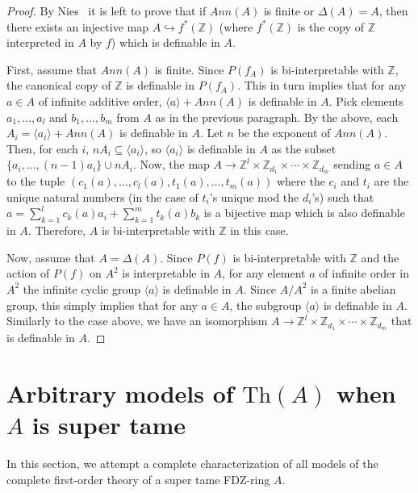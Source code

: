 \documentclass{article}
\theoremstyle{remark}
\newcommand{\Th}{\textrm{Th}}
\def\Z{{\mathbb{Z}}}
\begin{document}
\begin{proof}
By Nies~\cite{Nies2007} it is left to prove that if $Ann(A)$ is finite or $\Delta(A)=A$, then there exists an injective map $A\hookrightarrow f^*(\Z)$ (where $f^*(\Z)$ is the copy of $\Z$ interpreted in $A$ by $f$) which is definable in $A$.
 
    First, assume that $Ann(A)$ is finite. Since $P(f_A)$ is bi-interpretable with $\Z$, the canonical copy of $\Z$ is definable in $P(f_A)$. This in turn implies that for any $a\in A$ of infinite additive order, $\langle a\rangle+Ann(A)$ is definable in $A$. Pick elements $a_1,\ldots , a_l$ and $b_1, \ldots, b_m$ from $A$ as in the previous paragraph. By the above, each $A_i=\langle a_i\rangle+Ann(A)$ is definable in $A$. Let $n$ be the exponent of $Ann(A)$. Then, for each $i$, $nA_i \subseteq \langle a_i\rangle$, so $\langle a_i\rangle$ is definable in $A$ as the subset $\{a_i, \ldots, (n-1)a_i\}\cup nA_i$. Now, the map
$A\to \Z^l \times \Z_{d_1}\times \cdots \times \Z_{d_m}$ sending $a\in A$ to the tuple $(c_1(a), \ldots, c_l(a),t_1(a), \ldots, t_m(a))$ where the $c_i$ and $t_i$ are the unique natural numbers (in the case of $t_i$'s unique mod the $d_i$'s) such that $a=\sum_{k=1}^lc_k(a) a_i + \sum_{k=1}^mt_k(a) b_k$ is a bijective map which is also definable in $A$. Therefore, $A$ is bi-interpretable with $\Z$  in this case.

Now, assume that $A=\Delta(A)$. Since $P(f)$ is bi-interpretable with $\Z$ and the action of $P(f)$ on $A^2$ is interpretable in $A$, for any element $a$ of infinite order in $A^2$ the infinite cyclic group $\langle a\rangle$ is definable in $A$. Since $A/A^2$ is a finite abelian group, this simply implies that for any $a\in A$, the subgroup $\langle a\rangle$ is definable in $A$. Similarly to the case above, we have an isomorphism $A\to \Z^l \times \Z_{d_1}\times \cdots \times \Z_{d_m}$ that is definable in $A$.

 \end{proof}   
  
\section{Arbitrary models of \texorpdfstring{$\Th(A)$}{Th(A)} when $A$ is super tame} \label{sec:A-super-tame}
In this section, we attempt a complete characterization of all models of the complete first-order theory of a super tame FDZ-ring $A$.
\end{document}
